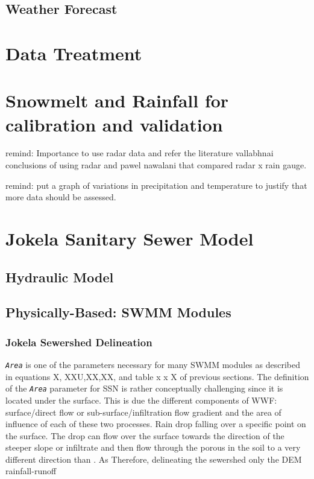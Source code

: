     
    \subsection{Weather Forecast}

\section{Data Treatment}

\section{Snowmelt and Rainfall for calibration and validation}



remind: Importance to use radar data and refer the literature vallabhnai conclusions of using radar and pawel nawalani that compared radar x rain gauge. 

remind: put a graph of variations in precipitation and temperature to justify that more data should be assessed. 


\section{Jokela Sanitary Sewer Model}

    \subsection{Hydraulic Model}
    
    \subsection{Physically-Based: SWMM Modules}


        \subsubsection{Jokela Sewershed Delineation}

\texttt{\textit{Area}} is one of the parameters necessary for many SWMM modules as described in equations X, XXU,XX,XX, and table x x X of previous sections. The definition of the \texttt{\textit{Area}} parameter for \acf{SSN} is rather conceptually challenging since it is located under the surface. This is due the different components of \ac{WWF}: surface/direct flow or sub-surface/infiltration flow gradient and the area of influence of each of these two processes. Rain drop falling over a specific point on the surface. The drop can flow over the surface towards the direction of the steeper slope or infiltrate and then flow through the porous in the soil to a very different direction than . As 
Therefore, delineating the sewershed only the \acf{DEM} rainfall-runoff

